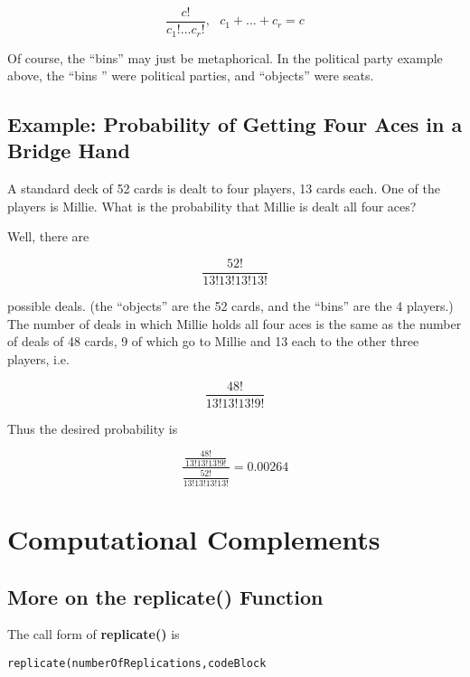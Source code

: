 \begin{equation}
\frac{c!}{c_1!...c_r!}, ~~~ c_1+...+c_r = c
\end{equation}

Of course, the ``bins'' may just be metaphorical.  In the political
party example above, the ``bins '' were political parties, and
``objects'' were seats.

\subsection{Example:  Probability of Getting Four Aces in a Bridge
Hand}

A standard deck of 52 cards is dealt to four players, 13 cards each.
One of the players is Millie.  What is the probability that Millie is
dealt all four aces?

Well, there are

\begin{equation}
\frac{52!}{13!13!13!13!}
\end{equation}

possible deals.  (the ``objects'' are the 52 cards, and the ``bins'' are
the 4 players.) The number of deals in which Millie holds all four aces
is the same as the number of deals of 48 cards, 9 of which go to Millie
and 13 each to the other three players, i.e.  

\begin{equation}
\frac{48!}{13!13!13!9!}
\end{equation}

Thus the desired probability is

\begin{equation}
\frac
{
\frac{48!}{13!13!13!9!}
}
{
\frac{52!}{13!13!13!13!}
}
= 0.00264
\end{equation}

\section{Computational Complements}

\subsection{More on the replicate() Function}

The call form of {\bf replicate()} is

\begin{lstlisting}
replicate(numberOfReplications,codeBlock
\end{lstlisting}

